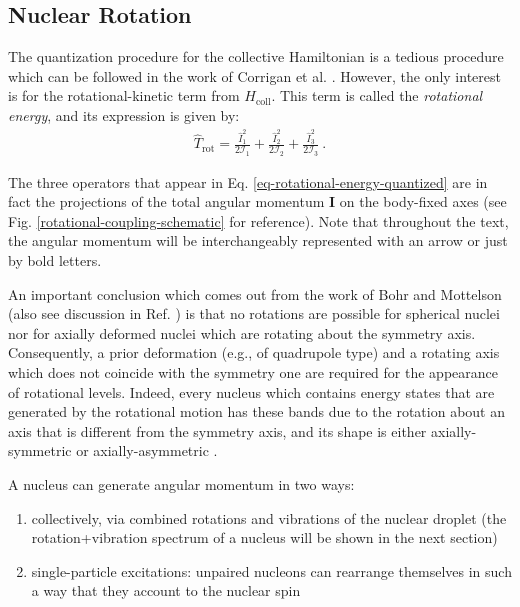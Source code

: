 \subsection{Nuclear Rotation}

The quantization procedure for the collective Hamiltonian is a tedious procedure which can be followed in the work of Corrigan et al. \cite{corrigan1976exact}. However, the only interest is for the rotational-kinetic term from $H_\text{coll}$. This term is called the \emph{rotational energy}, and its expression is given by:
\begin{align}
    \hat{T}_\text{rot}=\frac{\hat{I}_1^2}{2\mathcal{I}_1}+\frac{\hat{I}_2^2}{2\mathcal{I}_2}+\frac{\hat{I}_3^2}{2\mathcal{I}_3}\ .
    \label{eq-rotational-energy-quantized}
\end{align}

The three operators that appear in Eq. \ref{eq-rotational-energy-quantized} are in fact the projections of the total angular momentum $\mathbf{I}$ on the body-fixed axes (see Fig. \ref{rotational-coupling-schematic} for reference). Note that throughout the text, the angular momentum will be interchangeably represented with an arrow or just by bold letters.

An important conclusion which comes out from the work of Bohr and Mottelson \cite{bohr1954rotational} (also see discussion in Ref. \cite{greiner1996nuclear}) is that no rotations are possible for spherical nuclei nor for axially deformed nuclei which are rotating about the symmetry axis. Consequently, a prior deformation (e.g., of quadrupole type) and a rotating axis which does not coincide with the symmetry one are required for the appearance of rotational levels. Indeed, every nucleus which contains energy states that are generated by the rotational motion has these bands due to the rotation about an axis that is different from the symmetry axis, and its shape is either axially-symmetric or axially-asymmetric \cite{hamamoto2016interplay}.

A nucleus can generate angular momentum in two ways:
\begin{enumerate}
    \item collectively, via combined rotations and vibrations of the nuclear droplet (the rotation+vibration spectrum of a nucleus will be shown in the next section)
    \item single-particle excitations: unpaired nucleons can rearrange themselves in such a way that they account to the nuclear spin 
\end{enumerate}

